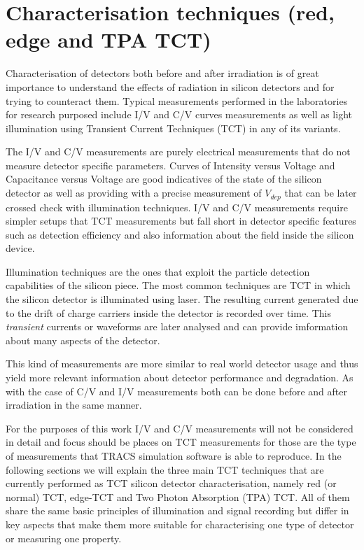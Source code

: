 \chapter{Characterisation techniques (red, edge and TPA TCT)}
\label{sec:tct}

Characterisation of detectors both before and after irradiation is of great importance to understand the effects of radiation in silicon detectors and for trying to counteract them. Typical measurements performed in the laboratories for research purposed include I/V and C/V curves measurements as well as light illumination using Transient Current Techniques (TCT) in any of its variants. 

The I/V and C/V measurements are purely electrical measurements that do not measure detector specific parameters. Curves of Intensity versus Voltage and Capacitance versus Voltage are good indicatives of the state of the silicon detector as well as providing with a precise measurement of $V_{dep}$ that can be later crossed check with illumination techniques. I/V and C/V measurements require simpler setups that TCT measurements but fall short in detector specific features such as detection efficiency and also information about the field inside the silicon device.

Illumination techniques are the ones that exploit the particle detection capabilities of the silicon piece. The most common techniques are TCT in which the silicon detector is illuminated using laser. The resulting current generated due to the drift of charge carriers inside the detector is recorded over time. This \textit{transient} currents or waveforms are later analysed and can provide imformation about many aspects of the detector.

This kind of measurements are more similar to real world detector usage and thus yield more relevant information about detector performance and degradation. As with the case of C/V and I/V measurements both can be done before and after irradiation in the same manner.

For the purposes of this work I/V and C/V measurements will not be considered in detail and focus should be places on TCT measurements for those are the type of measurements that TRACS simulation software is able to reproduce. In the following sections we will explain the three main TCT techniques that are currently performed as TCT silicon detector characterisation, namely red (or normal) TCT, edge-TCT and Two Photon Absorption (TPA) TCT. All of them share the same basic principles of illumination and signal recording but differ in key aspects that make them more suitable for characterising one type of detector or measuring one property. 

